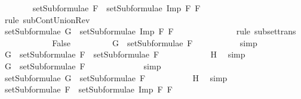 \begin{isabellebody}
\ \ \ \ \ \ \isamarkupfalse%
\ {}{\isacharcolon}{\isachardoublequoteopen}setSubformulae\ F{}\ {\isasymsubseteq}\ setSubformulae\ {\isacharparenleft}Imp\ F{}\ F{}{\isacharparenright}{\isachardoublequoteclose}\ \isanewline
\ \ \ \ \ \ \ \ \isamarkupfalse%
\ {}\ \isamarkupfalse%
\ {\isacharparenleft}rule\ subContUnionRev{}{\isacharparenright}\ \ \isanewline
\ \ \ \ \ \ \isamarkupfalse%
\ {\isachardoublequoteopen}setSubformulae\ G\ {\isasymsubseteq}\ setSubformulae\ {\isacharparenleft}Imp\ F{}\ F{}{\isacharparenright}{\isachardoublequoteclose}\ \isanewline
\ \ \ \ \ \ \ \ \isamarkupfalse%
\ {}\ {}\ \isamarkupfalse%
\ {\isacharparenleft}rule\ subset{\isacharunderscore}trans{\isacharparenright}\isanewline
\ \ \ \ \isamarkupfalse%
\isanewline
\ \ \ \ \ \ \isamarkupfalse%
\ False\isanewline
\ \ \ \ \ \ \isamarkupfalse%
\ \isamarkupfalse%
\ {}{\isacharcolon}{\isachardoublequoteopen}G\ {\isasymnotin}\ setSubformulae\ F{}{\isachardoublequoteclose}\ \isanewline
\ \ \ \ \ \ \ \ \isamarkupfalse%
\ simp\isanewline
\ \ \ \ \ \ \isamarkupfalse%
\ {\isachardoublequoteopen}G\ {\isasymin}\ setSubformulae\ F{}\ {\isasymunion}\ setSubformulae\ F{}{\isachardoublequoteclose}\ \isanewline
\ \ \ \ \ \ \ \ \isamarkupfalse%
\ {}\ H{}\ \isamarkupfalse%
\ simp\isanewline
\ \ \ \ \ \ \isamarkupfalse%
\ \isamarkupfalse%
\ {\isachardoublequoteopen}G\ {\isasymin}\ setSubformulae\ F{}{\isachardoublequoteclose}\ \isanewline
\ \ \ \ \ \ \ \ \isamarkupfalse%
\ {}\ \isamarkupfalse%
\ simp\isanewline
\ \ \ \ \ \ \isamarkupfalse%
\ \isamarkupfalse%
\ {}{}{\isacharcolon}{\isachardoublequoteopen}setSubformulae\ G\ {\isasymsubseteq}\ setSubformulae\ F{}{\isachardoublequoteclose}\ \isanewline
\ \ \ \ \ \ \ \ \isamarkupfalse%
\ H{}\ \isamarkupfalse%
\ simp\isanewline
\ \ \ \ \ \ \isamarkupfalse%
\ {}{}{\isacharcolon}{\isachardoublequoteopen}setSubformulae\ F{}\ {\isasymsubseteq}\ setSubformulae\ {\isacharparenleft}Imp\ F{}\ F{}{\isacharparenright}{\isachardoublequoteclose}\ \isanewline

\end{isabellebody}
